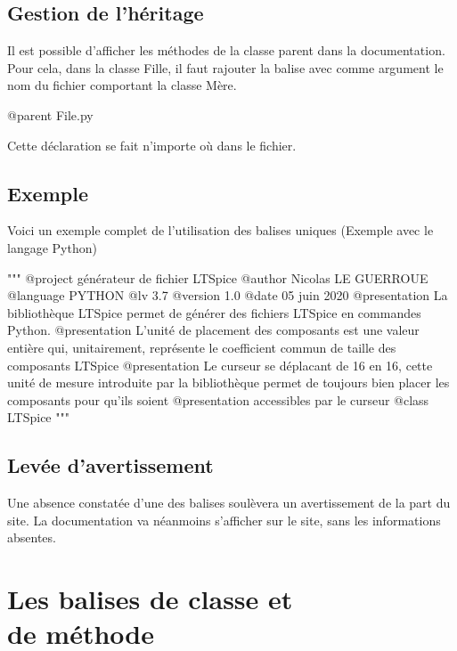 \section{Gestion de l'héritage}

Il est possible d'afficher les méthodes de la classe parent dans la documentation. Pour cela, dans la classe Fille, il faut rajouter la balise  avec comme argument le nom du fichier comportant la classe Mère.
\begin{Python}
@parent File.py 
\end{Python}
Cette déclaration se fait n'importe où dans le fichier.

\section{Exemple}


Voici un exemple complet de l'utilisation des balises uniques (Exemple avec le langage Python)

\begin{Python}
"""
@project générateur de fichier LTSpice
@author Nicolas LE GUERROUE
@language PYTHON
@lv 3.7
@version 1.0
@date 05 juin 2020
@presentation La bibliothèque LTSpice permet de générer des fichiers LTSpice en commandes Python.
@presentation L'unité de placement des composants est une valeur entière qui, unitairement, représente le coefficient commun de taille des composants LTSpice
@presentation Le curseur se déplacant de 16 en 16, cette unité de mesure introduite par la bibliothèque permet de toujours bien placer les composants pour qu'ils soient
@presentation accessibles par le curseur
@class LTSpice
"""
\end{Python}


\section{Levée d'avertissement}

Une absence constatée d'une des balises soulèvera un avertissement de la part du site. La documentation va néanmoins s'afficher sur le site, sans les informations absentes.


\newpage

\chapter{Les balises de classe et \\de méthode}

